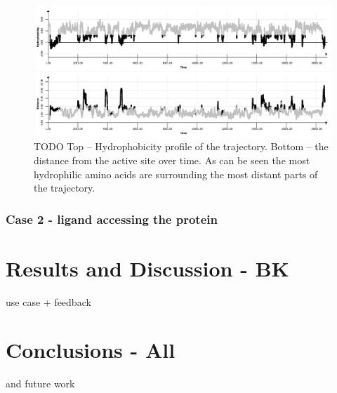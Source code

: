 \documentclass[twocolumn]{bmcart}%
\begin{document}
\begin{figure}[htb]
	\centering
  \includegraphics[width=0.95\linewidth]{img/case_hydro_distance.png}
  \caption{\label{fig:case_hydro_distance} {\color{red}TODO} Top -- Hydrophobicity profile of the trajectory. Bottom -- the distance from the active site over time. As can be seen the most hydrophilic amino acids are surrounding the most distant parts of the trajectory.}
\end{figure}








 



\subsubsection{Case 2 - ligand accessing the protein}
\label{sec:case2}
  



\section*{Results and Discussion - BK}
use case + feedback

\section*{Conclusions - All}
and future work 
\end{document}
